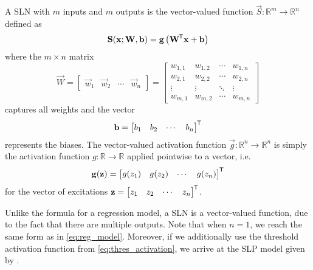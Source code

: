 \begin{definition}
    \label{def:sln}
    A SLN with $m$ inputs and $m$ outputs is the vector-valued function
    $\vec{S}: \mathbb{R}^m \rightarrow \mathbb{R}^n$ defined as
    \begin{equation}
        \label{eq:single_layer_perceptron}
        \mathbf{S}(\mathbf{x}; \mathbf{W}, \mathbf{b}) = \mathbf{g}\left( \mathbf{W}^{\mkern-1.5mu\mathsf{T}} \mathbf{x} + \mathbf{b} \right)
    \end{equation}
    where the  $m \times n$ matrix
    \begin{equation}
        \label{eq:sln_weight_matrix}
        \vec{W} = \begin{bmatrix}
            \vec{w}_1 & \vec{w}_2 & \cdots & \vec{w}_n
        \end{bmatrix} = \begin{bmatrix}
            w_{1,1} & w_{1,2} & \cdots & w_{1,n} \\
            w_{2,1} & w_{2,2} & \cdots & w_{2,n} \\
            \vdots & \vdots & \ddots & \vdots \\
            w_{m,1} & w_{m,2} & \cdots & w_{m,n}
        \end{bmatrix}
    \end{equation}
    captures all weights and the vector
    \begin{equation}
        \label{eq:sln_bias}
        \mathbf{b} = \begin{bmatrix}
            b_1 & b_2 & \cdots & b_n
        \end{bmatrix}^{\mkern-1.5mu\mathsf{T}}
    \end{equation}
    represents the biases.
    The vector-valued activation function $\vec{g} : \mathbb{R}^n \rightarrow \mathbb{R}^n$ is simply the activation function $g: \mathbb{R} \rightarrow \mathbb{R}$ applied pointwise to a vector, i.e.
    \begin{equation*}
        \mathbf{g}(\mathbf{z}) = \begin{bmatrix}
            g(z_1) & g(z_2) & \cdots & g(z_n)
        \end{bmatrix}^{\mkern-1.5mu\mathsf{T}}
    \end{equation*}
    for the vector of excitations
    $
        \mathbf{z} = \begin{bmatrix}
            z_1 & z_2 & \cdots & z_n
        \end{bmatrix}^{\mkern-1.5mu\mathsf{T}}
    $.
\end{definition}

Unlike the formula for a regression model, a SLN is a vector-valued function, due to the fact that there are multiple outputs. 
Note that when $n=1$, we reach the same form as in \ref{eq:reg_model}. 
Moreover, if we additionally use the threshold activation function from \ref{eq:thres_activation}, we arrive at the SLP model given by \textcite{rosenblatt1958}.

